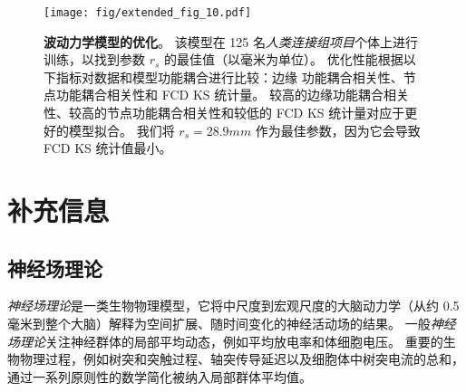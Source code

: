 \documentclass[lang=cn,a4paper,newtx,citestyle=gb7714-2015, bibstyle=gb7714-2015]{elegantpaper}
\begin{document}
\begin{figure}[!htb] 
	\centering
	\texttt{[image: fig/extended\_fig\_10.pdf]}
	\caption{\textbf{波动力学模型的优化}。
	该模型在 125 名\textit{人类连接组项目}个体上进行训练，以找到参数 $ r_s $ 的最佳值（以毫米为单位）。
	优化性能根据以下指标对数据和模型功能耦合进行比较：边缘 功能耦合相关性、节点功能耦合相关性和 FCD KS 统计量。
	较高的边缘功能耦合相关性、较高的节点功能耦合相关性和较低的 FCD KS 统计量对应于更好的模型拟合。
	我们将 $ r_s = 28.9 mm $ 作为最佳参数，因为它会导致 FCD KS 统计值最小。}
	\label{fig:extended_fig_10}
\end{figure}



\section{补充信息}

\subsection{神经场理论} \label{sec:NFT}

\textit{神经场理论}是一类生物物理模型，它将中尺度到宏观尺度的大脑动力学（从约 0.5 毫米到整个大脑）解释为空间扩展、随时间变化的神经活动场的结果\cite{beurle1956properties,da1976models,wright1995simulation,deco2008dynamic,jirsa1996field,robinson1997propagation,robinson2005multiscale}。
一般\textit{神经场理论}关注神经群体的局部平均动态，例如平均放电率和体细胞电压。
重要的生物物理过程，例如树突和突触过程、轴突传导延迟以及细胞体中树突电流的总和，通过一系列原则性的数学简化被纳入局部群体平均值。
\end{document}
